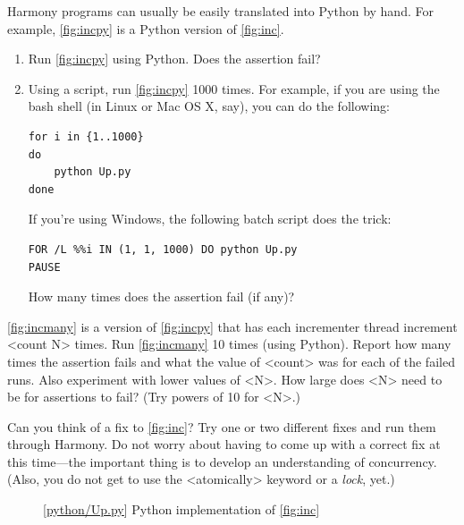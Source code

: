 \documentclass{report}
\newcommand{\harmonylink}[1]{%
[\href{https://harmony.cs.cornell.edu/#1}{\underline{#1}}]%
}
\newenvironment{code}{
\tcolorbox
}{
\endtcolorbox
}
\begin{document}
\begin{problems}
\item Harmony programs can usually be easily translated into
Python by hand.  For example,
\autoref{fig:incpy} is a Python version of \autoref{fig:inc}.
\begin{enumerate}
\item Run \autoref{fig:incpy} using Python.  Does the assertion fail?
\item Using a script, run \autoref{fig:incpy} 1000 times.
For example, if you are using the bash shell (in Linux or Mac OS X, say), you can do the following:
\begin{code}
\begin{verbatim}
for i in {1..1000}
do
    python Up.py
done
\end{verbatim}
\end{code}
If you're using Windows, the following batch script does the trick:
\begin{code}
\begin{verbatim}
FOR /L %%i IN (1, 1, 1000) DO python Up.py
PAUSE
\end{verbatim}
\end{code}
How many times does the assertion fail (if any)?
\end{enumerate}
\item \autoref{fig:incmany} is a version of \autoref{fig:incpy} that has each
incrementer thread increment <{count N}> times.  Run \autoref{fig:incmany}
10 times (using Python).
Report how many times the assertion fails and what the value of <{count}>
was for each of the failed runs.
Also experiment with lower values of <{N}>.
How large does <{N}> need to be for assertions to fail?
(Try powers of 10 for <{N}>.)
\item Can you think of a fix to \autoref{fig:inc}?  Try one or two different fixes
and run them through Harmony.  Do not worry about having to come up with a correct fix at this
time---the important thing is to develop an understanding of concurrency.
(Also, you do not get to use the <{atomically}> keyword
or a \emph{lock}, yet.)
\end{problems}

\begin{figure}
\begin{code}
\end{code}
\caption{\harmonylink{python/Up.py} Python implementation of \autoref{fig:inc}}
\label{fig:incpy}
\end{figure}
\end{document}
